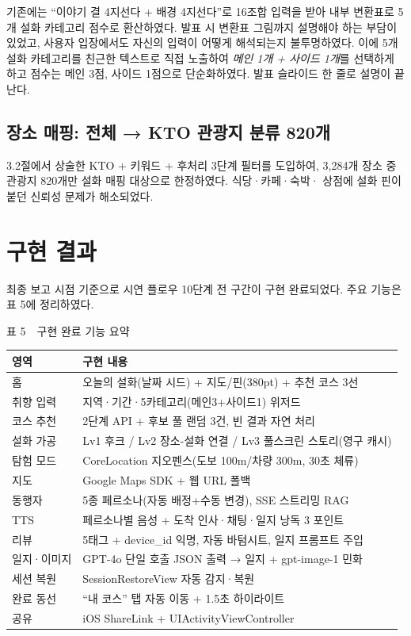 \documentclass[10pt,twocolumn,a4paper]{article}
\begin{document}
기존에는 ``이야기 결 4지선다 + 배경 4지선다''로 16조합 입력을 받아 내부
변환표로 5개 설화 카테고리 점수로 환산하였다. 발표 시 변환표 그림까지
설명해야 하는 부담이 있었고, 사용자 입장에서도 자신의 입력이 어떻게
해석되는지 불투명하였다. 이에 5개 설화 카테고리를 친근한 텍스트로 직접
노출하여 \emph{메인 1개 + 사이드 1개}를 선택하게 하고 점수는 메인 3점,
사이드 1점으로 단순화하였다. 발표 슬라이드 한 줄로 설명이 끝난다.

\subsection{장소 매핑: 전체 → KTO 관광지 분류 820개}

3.2절에서 상술한 KTO + 키워드 + 후처리 3단계 필터를 도입하여, 3{,}284개
장소 중 관광지 820개만 설화 매핑 대상으로 한정하였다. 식당·카페·숙박·
상점에 설화 핀이 붙던 신뢰성 문제가 해소되었다.

\section{구현 결과}

최종 보고 시점 기준으로 시연 플로우 10단계 전 구간이 구현 완료되었다.
주요 기능은 표 5에 정리하였다.

\begin{table}[H]
\centering
{\small 표 5~~구현 완료 기능 요약}
\label{tab:impl}
\vspace{2pt}

\footnotesize
\begin{tabularx}{\columnwidth}{lX}
\toprule
영역 & 구현 내용 \\
\midrule
홈 & 오늘의 설화(날짜 시드) + 지도/핀(380pt) + 추천 코스 3선 \\
취향 입력 & 지역·기간·5카테고리(메인3+사이드1) 위저드 \\
코스 추천 & 2단계 API + 후보 풀 랜덤 3건, 빈 결과 자연 처리 \\
설화 가공 & Lv1 후크 / Lv2 장소-설화 연결 / Lv3 풀스크린 스토리(영구 캐시) \\
탐험 모드 & CoreLocation 지오펜스(도보 100m/차량 300m, 30초 체류) \\
지도 & Google Maps SDK + 웹 URL 폴백 \\
동행자 & 5종 페르소나(자동 배정+수동 변경), SSE 스트리밍 RAG \\
TTS & 페르소나별 음성 + 도착 인사·채팅·일지 낭독 3 포인트 \\
리뷰 & 5태그 + device\_id 익명, 자동 바텀시트, 일지 프롬프트 주입 \\
일지·이미지 & GPT-4o 단일 호출 JSON 출력 → 일지 + gpt-image-1 민화 \\
세션 복원 & SessionRestoreView 자동 감지·복원 \\
완료 동선 & ``내 코스'' 탭 자동 이동 + 1.5초 하이라이트 \\
공유 & iOS ShareLink + UIActivityViewController \\
\bottomrule
\end{tabularx}
\end{table}
\end{document}
